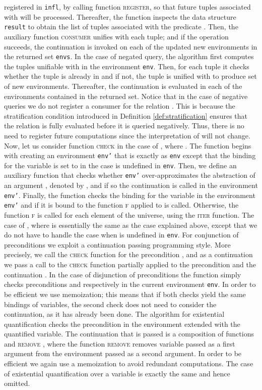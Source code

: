 registered in {\tt infl}, by calling function \textsc{register}, so
that future tuples associated with  will be processed. Thereafter,
the function inspects the data structure \texttt{result} to obtain the
list of tuples associated with the predicate . Then, the auxiliary
function \textsc{consumer} unifies  with each tuple; and
if the operation succeeds, the continuation  is invoked on each
of the updated new environments in the returned set \texttt{envs}.
In the case of negated query, the algorithm first computes the tuples
unifiable with  in the environment \texttt{env}. Then,
for each tuple it checks whether the tuple is already in  and if
not, the tuple is unified with  to produce set of new
environments. Thereafter, the continuation  is evaluated in each
of the environments contained in the returned set. Notice that in the
case of negative queries we do not register a consumer for the
relation . This is because the stratification condition introduced
in Definition \ref{def:stratification} ensures that the relation is
fully evaluated before it is queried negatively. Thus, there is no
need to register future computations since the interpretation of 
will not change.
Now, let us consider function \textsc{check} in the case of ,
where . The function begins with creating an
environment {\tt env'} that is exactly as {\tt env} except that the
binding for the variable  is set to  in the case  is
undefined in {\tt env}. Then, we define an auxiliary function that
checks whether {\tt env'} over-approximates the abstraction of an
argument , denoted by , and if so the continuation is
called in the environment {\tt env'}. Finally, the
function checks the binding for the variable  in the environment
{\tt env'} and if it is bound to  the function \textsc{f}
applied to  is called. Otherwise, the function \textsc{f} is called
for each element of the universe, using the \textsc{iter}
function. The case of , where  is essentially the same
as the case explained above, except that we do not have to handle the
case when  is undefined in {\tt env}.
For conjunction of preconditions we exploit a continuation passing
programming style. More precisely, we call the \textsc{check} function
for the precondition , and as a continuation we pass a call to
the \textsc{check} function partially applied to the precondition
 and the continuation .
In the case of disjunction of preconditions the function simply checks
preconditions  and  respectively in the current
environment \texttt{env}. In order to be efficient we use memoization;
this means that if both checks yield the same bindings of variables,
the second check does not need to consider the continuation, as it has
already been done.
The algorithm for existential quantification checks the precondition
 in the environment extended with the quantified variable. The
continuation that is passed is a composition of functions  and
\textsc{remove} , where the function \textsc{remove} removes
variable passed as a first argument from the environment passed as a
second argument. In order to be efficient we again use a memoization
to avoid redundant computations. The case of existential
quantification over a variable  is exactly the same
and hence omitted.
